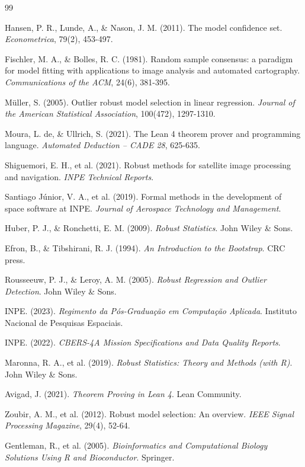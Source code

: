 \documentclass[12pt,a4paper]{article}
\begin{document}
\begin{thebibliography}{99}

   Hansen, P. R., Lunde, A., \& Nason, J. M. (2011). The model confidence set. \textit{Econometrica}, 79(2), 453-497.

   Fischler, M. A., \& Bolles, R. C. (1981). Random sample consensus: a paradigm for model fitting with applications to image analysis and automated cartography. \textit{Communications of the ACM}, 24(6), 381-395.

   Müller, S. (2005). Outlier robust model selection in linear regression. \textit{Journal of the American Statistical Association}, 100(472), 1297-1310.

   Moura, L. de, \& Ullrich, S. (2021). The Lean 4 theorem prover and programming language. \textit{Automated Deduction -- CADE 28}, 625-635.

   Shiguemori, E. H., et al. (2021). Robust methods for satellite image processing and navigation. \textit{INPE Technical Reports}.

   Santiago Júnior, V. A., et al. (2019). Formal methods in the development of space software at INPE. \textit{Journal of Aerospace Technology and Management}.

   Huber, P. J., \& Ronchetti, E. M. (2009). \textit{Robust Statistics}. John Wiley \& Sons.

   Efron, B., \& Tibshirani, R. J. (1994). \textit{An Introduction to the Bootstrap}. CRC press.

   Rousseeuw, P. J., \& Leroy, A. M. (2005). \textit{Robust Regression and Outlier Detection}. John Wiley \& Sons.

   INPE. (2023). \textit{Regimento da Pós-Graduação em Computação Aplicada}. Instituto Nacional de Pesquisas Espaciais.

   INPE. (2022). \textit{CBERS-4A Mission Specifications and Data Quality Reports}.

   Maronna, R. A., et al. (2019). \textit{Robust Statistics: Theory and Methods (with R)}. John Wiley \& Sons.

   Avigad, J. (2021). \textit{Theorem Proving in Lean 4}. Lean Community.

   Zoubir, A. M., et al. (2012). Robust model selection: An overview. \textit{IEEE Signal Processing Magazine}, 29(4), 52-64.

   Gentleman, R., et al. (2005). \textit{Bioinformatics and Computational Biology Solutions Using R and Bioconductor}. Springer.

\end{thebibliography}

\appendix

\end{document}
